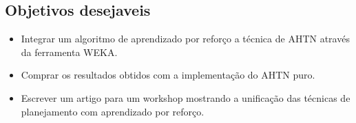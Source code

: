 \subsection{Objetivos desejaveis}
\begin{itemize}
	\item Integrar um algoritmo de aprendizado por reforço a técnica de AHTN através da ferramenta WEKA.
	\item Comprar os resultados obtidos com a implementação do AHTN puro.
	\item Escrever um artigo para um workshop mostrando a unificação das técnicas de planejamento com aprendizado por reforço.
\end{itemize}

 
